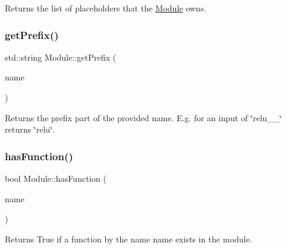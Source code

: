 \begin{DoxyReturn}{Returns}
the list of placeholders that the \hyperlink{classglow_1_1_module}{Module} owns. 
\end{DoxyReturn}
\mbox{\label{classglow_1_1_module_a467e5429bf807b3587748366c5a3bfd8}} 
\subsubsection{\texorpdfstring{get\+Prefix()}{getPrefix()}}
{\footnotesize\ttfamily std\+::string Module\+::get\+Prefix (\begin{DoxyParamCaption}\item[{llvm\+::\+String\+Ref}]{name }\end{DoxyParamCaption})\hspace{0.3cm}{\ttfamily [static]}}

\begin{DoxyReturn}{Returns}
the prefix part of the provided {\ttfamily name}. E.\+g. for an input of \char`\"{}relu\+\_\+\+\_\char`\"{} returns \char`\"{}relu\char`\"{}. 
\end{DoxyReturn}
\mbox{\label{classglow_1_1_module_aedef87903f635a844d4d45a2b43aaf03}} 
\subsubsection{\texorpdfstring{has\+Function()}{hasFunction()}}
{\footnotesize\ttfamily bool Module\+::has\+Function (\begin{DoxyParamCaption}\item[{llvm\+::\+String\+Ref}]{name }\end{DoxyParamCaption})}

\begin{DoxyReturn}{Returns}
True if a function by the name {\ttfamily name} exists in the module. 
\end{DoxyReturn}
\mbox{\label{classglow_1_1_module_a6b31e53e57587b15d32b32c6a0db5c05}} 
